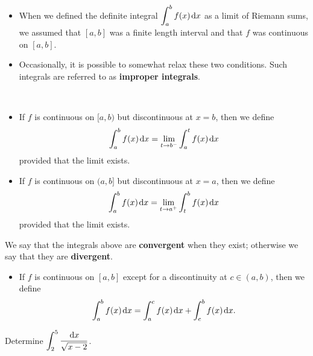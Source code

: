 \setcounter{chapter}{8}
\setcounter{section}{8}
\setcounter{theorem}{0}
\setcounter{equation}{0}


\begin{remark}\,
\begin{itemize}
\item When we defined the definite integral $\displaystyle\int_a^bf(x)\mkern 2mu \mathrm{d} x$ as a limit of Riemann sums, we assumed that $[a,b]$ was a finite length interval and that $f$ was continuous on $[a,b]$.
\item Occasionally, it is possible to somewhat relax these two conditions.
Such integrals are referred to as \textbf{improper integrals}.
\end{itemize}
\end{remark}

\begin{definition}\,
\begin{itemize}
\item If $f$ is continuous on $[a,b)$ but discontinuous at $x=b$, then we define
\begin{equation*}
\int_a^b f(x)\mkern 2mu \mathrm{d} x = \lim_{t\to b^-}\int_a^t f(x)\mkern 2mu \mathrm{d} x
\end{equation*}
provided that the limit exists.
\item If $f$ is continuous on $(a,b]$ but discontinuous at $x=a$, then we define
\begin{equation*}
\int_{a}^b f(x)\mkern 2mu \mathrm{d} x = \lim_{t\to a^+}\int_t^b f(x)\mkern 2mu \mathrm{d} x
\end{equation*}
provided that the limit exists.
\end{itemize}
We say that the integrals above are \textbf{convergent} when they exist; otherwise we say that they are \textbf{divergent}.
\begin{itemize}
\item If $f$ is continuous on $[a,b]$ except for a discontinuity at $c\in (a,b)$, then we define
\begin{equation*}
\int_{a}^b f(x)\mkern 2mu \mathrm{d} x = \int_{a}^cf(x)\mkern 2mu \mathrm{d} x + \int_c^b f(x)\mkern 2mu \mathrm{d} x.
\end{equation*}
\end{itemize}
\end{definition}

\begin{example}
Determine $\displaystyle\int_2^5\frac{\mkern 2mu \mathrm{d} x}{\sqrt{x-2}}$.
\end{example}

